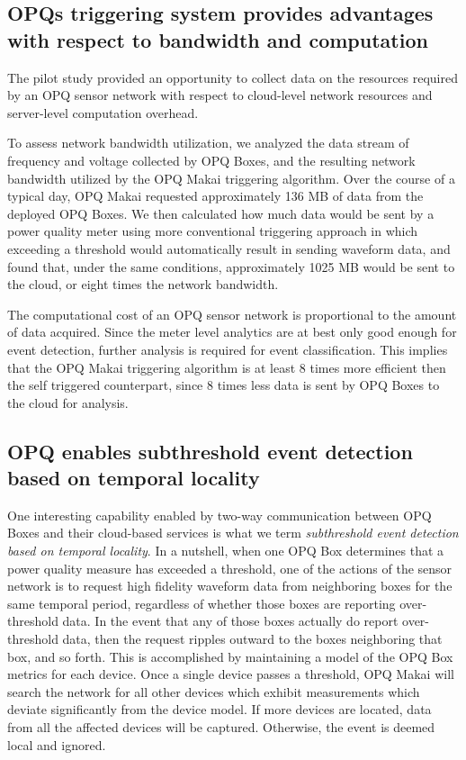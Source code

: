 \subsection{OPQs triggering system provides advantages with respect to bandwidth and computation}

The pilot study provided an opportunity to collect data on the resources required by an OPQ sensor network with respect to cloud-level network resources and server-level computation overhead.

To assess network bandwidth utilization, we analyzed the data stream of frequency and voltage collected by OPQ Boxes, and the resulting network bandwidth utilized by the OPQ Makai triggering algorithm. Over the course of a typical day, OPQ Makai requested approximately 136 MB of data from the deployed OPQ Boxes.  We then calculated how much data would be sent by a power quality meter using more conventional triggering approach in which exceeding a threshold would automatically result in sending waveform data, and found that, under the same conditions, approximately 1025 MB would be sent to the cloud, or eight times the network bandwidth.

The computational cost of an OPQ sensor network is proportional to the amount of data acquired. Since the meter level analytics are at best only good enough for event detection, further analysis is required for event classification.
This implies that the OPQ Makai triggering algorithm is at least 8 times more efficient then the self triggered counterpart, since 8 times less data is sent by OPQ Boxes to the cloud for analysis.

\subsection{OPQ enables subthreshold event detection based on temporal locality}
\label{sec:subthreshold-events}

One interesting capability enabled by two-way communication between OPQ Boxes and their cloud-based services is what we term {\em subthreshold event detection based on temporal locality}.
In a nutshell, when one OPQ Box determines that a power quality measure has exceeded a threshold, one of the actions of the sensor network is to request high fidelity waveform data from neighboring boxes for the same temporal period, regardless of whether those boxes are reporting over-threshold data.
In the event that any of those boxes actually do report over-threshold data, then the request ripples outward to the boxes neighboring that box, and so forth.
This is accomplished by maintaining a model of the OPQ Box metrics for each device.
Once a single device passes a threshold, OPQ Makai will search the network for all other devices which exhibit measurements which deviate significantly from the device model.
If more devices are located, data from all the affected devices will be captured.
Otherwise, the event is deemed local and ignored.

